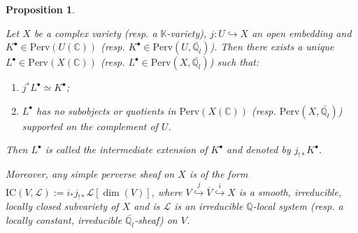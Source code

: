 \documentclass[11pt,english]{article}
\numberwithin{equation}{section}
\numberwithin{figure}{section}
\theoremstyle{definition}
\theoremstyle{plain}
\newtheorem{prop}[df]{Proposition}
\theoremstyle{remark}
\newcommand\QQ{\mathbb{Q}}
\newcommand\KK{\mathbb{K}}
\newcommand\CC{\mathbb{C}}
\begin{document}
\begin{prop}{\cite[\S 5.2.]{Dim04}\cite[\S III.5.]{KW01}}

Let $X$ be a complex variety (resp. a $\KK$-variety), $j:U\hookrightarrow X$
an open embedding and $K^{\bullet}\in\mathrm{Perv}(U(\CC))$ (resp.
$K^{\bullet}\in\mathrm{Perv}(U,\bar{\QQ_{l}})$). Then there exists
a unique $L^{\bullet}\in\mathrm{Perv}(X(\CC))$ (resp. $L^{\bullet}\in\mathrm{Perv}(X,\bar{\QQ_{l}})$)
such that:
\begin{enumerate}
\item $j^{*}L^{\bullet}\simeq K^{\bullet}$;
\item $L^{\bullet}$ has no subobjects or quotients in $\mathrm{Perv}(X(\CC))$
(resp. $\mathrm{Perv}(X,\bar{\QQ_{l}})$) supported on the complement
of $U$.
\end{enumerate}
Then $L^{\bullet}$ is called the intermediate extension of $K^{\bullet}$
and denoted by $j_{!*}K^{\bullet}$.

Moreover, any simple perverse sheaf on $X$ is of the form $\mathrm{IC}(V,\mathcal{L}):=i_{*}j_{!*}\mathcal{L}[\dim(V)]$,
where $V\overset{j}{\hookrightarrow}\overline{V}\overset{i}{\hookrightarrow}X$
is a smooth, irreducible, locally closed subvariety of $X$ and is
$\mathcal{L}$ is an irreducible $\QQ$-local system (resp. a locally
constant, irreducible $\bar{\QQ_{l}}$-sheaf) on $V$.

\end{prop}

\end{document}
